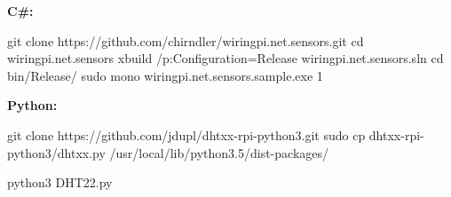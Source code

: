 \textbf{C\#:}

\begin{console}
	git clone https://github.com/chirndler/wiringpi.net.sensors.git
	cd wiringpi.net.sensors
	xbuild /p:Configuration=Release wiringpi.net.sensors.sln
	cd bin/Release/
	sudo mono wiringpi.net.sensors.sample.exe 1
\end{console}

\textbf{Python:}
\begin{console}
	git clone https://github.com/jdupl/dhtxx-rpi-python3.git
	sudo cp dhtxx-rpi-python3/dhtxx.py /usr/local/lib/python3.5/dist-packages/
\end{console}

\lstset{language=Python, caption=, 
        label=DHT22Program, frame=single, basicstyle=\ttfamily
	      \footnotesize, breakatwhitespace=false, showstringspaces=false, 
        showtabs=false, tabsize=2 }


\begin{console}
	python3 DHT22.py
\end{console}
